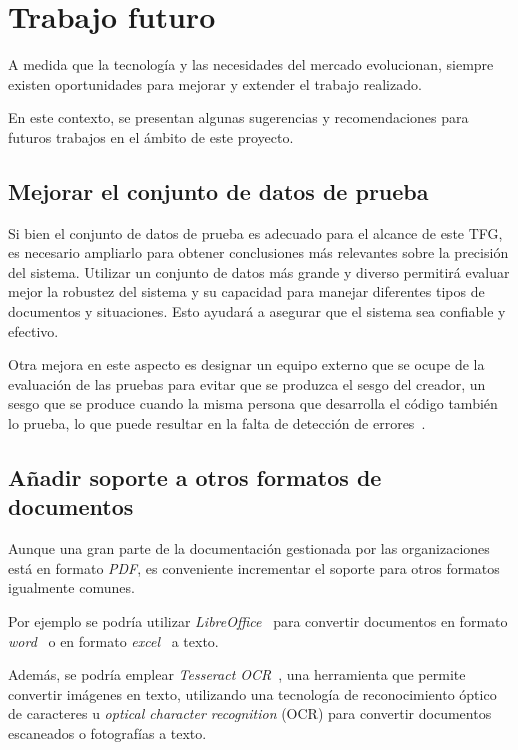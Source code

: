 \section{Trabajo futuro}

A medida que la tecnología y las necesidades del mercado evolucionan, siempre existen oportunidades para mejorar y
extender el trabajo realizado.

En este contexto, se presentan algunas sugerencias y recomendaciones para futuros trabajos en el ámbito de este
proyecto.

\subsection*{Mejorar el conjunto de datos de prueba}

Si bien el conjunto de datos de prueba es adecuado para el alcance de este TFG, es necesario ampliarlo para obtener
conclusiones más relevantes sobre la precisión del sistema.
Utilizar un conjunto de datos más grande y diverso permitirá evaluar mejor la robustez del sistema y su capacidad para
manejar diferentes tipos de documentos y situaciones.
Esto ayudará a asegurar que el sistema sea confiable y efectivo.

Otra mejora en este aspecto es designar un equipo externo que se ocupe de la evaluación de las pruebas para evitar que
se produzca el sesgo del creador, un sesgo que se produce cuando la misma persona que desarrolla el código también lo
prueba, lo que puede resultar en la falta de detección de errores~\cite{url_test_io_bias_software_testing}.

\subsection*{Añadir soporte a otros formatos de documentos}

Aunque una gran parte de la documentación gestionada por las organizaciones está en formato \textit{PDF}, es
conveniente incrementar el soporte para otros formatos igualmente comunes.

Por ejemplo se podría utilizar \textit{LibreOffice}~\cite{url_libreoffice} para convertir documentos en formato
\textit{word}~\cite{url_microsoft_word} o en formato \textit{excel}~\cite{url_microsoft_excel} a texto.

Además, se podría emplear \textit{Tesseract OCR}~\cite{url_tesseract}, una herramienta que permite convertir
imágenes en texto, utilizando una tecnología de reconocimiento óptico de caracteres u
\textit{optical character recognition} (OCR) para convertir documentos escaneados o fotografías a texto.

